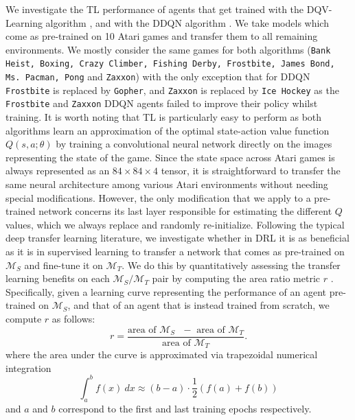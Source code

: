 We investigate the TL performance of agents that get trained with the DQV-Learning algorithm \cite{sabatelli2018deep}, and with the DDQN algorithm \cite{van2016deep}. We take models which come as pre-trained on 10 Atari games and transfer them to all remaining environments. We mostly consider the same games for both algorithms (\texttt{Bank Heist, Boxing, Crazy Climber, Fishing Derby, Frostbite, James Bond, Ms. Pacman, Pong} and \texttt{Zaxxon}) with the only exception that for DDQN \texttt{Frostbite} is replaced by \texttt{Gopher}, and \texttt{Zaxxon} is replaced by \texttt{Ice Hockey} as the \texttt{Frostbite} and \texttt{Zaxxon} DDQN agents failed to improve their policy whilst training. It is worth noting that TL is particularly easy to perform as both algorithms learn an approximation of the optimal state-action value function $Q(s,a;\theta)$ by training a convolutional neural network directly on the images representing the state of the game. Since the state space across Atari games is always represented as an $84\times84\times4$ tensor, it is straightforward to transfer the same neural architecture among various Atari environments without needing special modifications. However, the only modification that we apply to a pre-trained network concerns its last layer responsible for estimating the different $Q$ values, which we always replace and randomly re-initialize. Following the typical deep transfer learning literature, we investigate whether in DRL it is as beneficial as it is in supervised learning to transfer a network that comes as pre-trained on $\mathcal{M}_S$ and fine-tune it on $\mathcal{M}_T$. We do this by quantitatively assessing the transfer learning benefits on each $\mathcal{M}_S/\mathcal{M}_T$ pair by computing the area ratio metric $r$ \cite{taylor2009transfer}. Specifically, given a learning curve representing the performance of an agent pre-trained on $\mathcal{M}_S$, and that of an agent that is instead trained from scratch, we compute $r$ as follows:
\begin{equation}
	r = \frac{\text{area of $\mathcal{M}_S$ $-$ area of $\mathcal{M}_T$}}{\text{area of $\mathcal{M}_T$}}.
\label{eq:area_ratio_metric}
\end{equation}
where the area under the curve is approximated via trapezoidal numerical integration
\begin{equation}
	\int^{b}_{a}f(x)\:dx \approx(b-a) \cdot \frac{1}{2}(f(a)+f(b))
\end{equation}
and $a$ and $b$ correspond to the first and last training epochs respectively.

